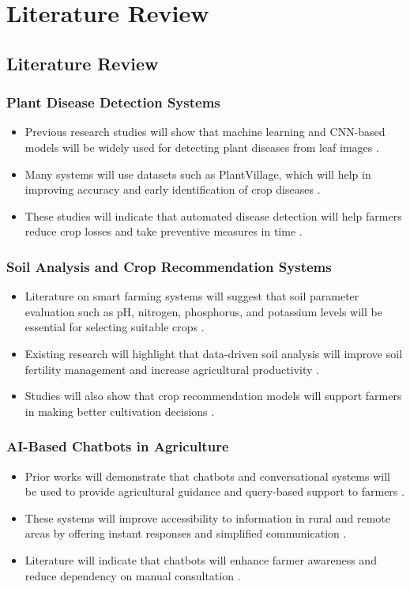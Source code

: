 \chapter{Literature Review}
\section{Literature Review}

\subsection{Plant Disease Detection Systems}
\begin{itemize}
    \item Previous research studies will show that machine learning and CNN-based models will be widely used for detecting plant diseases from leaf images \cite{1}.
    \item Many systems will use datasets such as PlantVillage, which will help in improving accuracy and early identification of crop diseases \cite{2}.
    \item These studies will indicate that automated disease detection will help farmers reduce crop losses and take preventive measures in time \cite{3}.
\end{itemize}

\subsection{Soil Analysis and Crop Recommendation Systems}
\begin{itemize}
    \item Literature on smart farming systems will suggest that soil parameter evaluation such as pH, nitrogen, phosphorus, and potassium levels will be essential for selecting suitable crops \cite{4}.
    \item Existing research will highlight that data-driven soil analysis will improve soil fertility management and increase agricultural productivity \cite{5}.
    \item Studies will also show that crop recommendation models will support farmers in making better cultivation decisions \cite{6}.
\end{itemize}
\newpage

\subsection{AI-Based Chatbots in Agriculture}
\begin{itemize}
    \item Prior works will demonstrate that chatbots and conversational systems will be used to provide agricultural guidance and query-based support to farmers \cite{7}.
    \item These systems will improve accessibility to information in rural and remote areas by offering instant responses and simplified communication \cite{8}.
    \item Literature will indicate that chatbots will enhance farmer awareness and reduce dependency on manual consultation \cite{9}.
\end{itemize}


